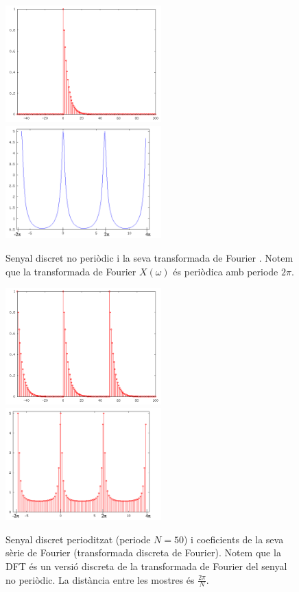 \documentclass{article}
\begin{document}
\begin{figure}[htbp]
\begin{center}
\includegraphics[width=6cm]{signal0_T4.png} 
$\qquad$
\includegraphics[width=6cm]{TFsignal0bis_T4.png} 
\end{center}
\caption{Senyal discret no peri\`odic i la seva transformada de Fourier .
Notem que la transformada de Fourier $X(\omega)$ \'es peri\`odica amb periode $2\pi$.}
\label{exTFDFT1}
\end{figure}

\begin{figure}[htbp]
\begin{center}
\includegraphics[width=6cm]{signal0P_T4.png} 
$\qquad$
\includegraphics[width=6cm]{TFsignal0Pbis_T4.png} 
\end{center}
\caption{Senyal discret perioditzat (periode $N=50$) i coeficients de la seva s\`erie de Fourier (transformada discreta de Fourier).
Notem que la DFT \'es un versi\'o discreta de la transformada de Fourier del senyal no peri\`odic. La dist\`ancia
entre les mostres \'es $\frac{2\pi}{N}$.}
\label{exTFDFT2}
\end{figure}
\end{document}
